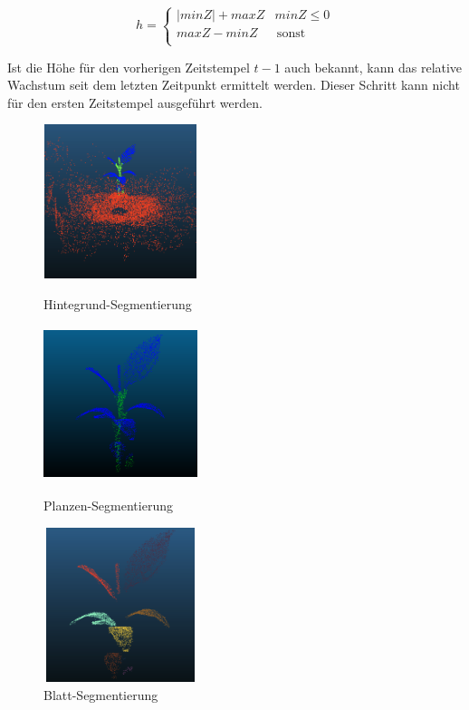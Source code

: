 \documentclass[12pt,titlepage, twoside]{article}
\begin{document}
\begin{equation}
    \label{eq:height}
    h = \left\{
    \begin{array}{ll}
    |minZ| + maxZ & minZ \leq 0 \\
    maxZ - minZ & \, \textrm{sonst} \\
    \end{array}
    \right. 
\end{equation}

Ist die Höhe für den vorherigen Zeitstempel $t-1$ auch bekannt, kann das relative Wachstum seit dem letzten Zeitpunkt ermittelt werden. Dieser Schritt kann nicht für den ersten Zeitstempel ausgeführt werden.

\begin{figure}
    \centering
    \begin{minipage}{0.3\textwidth}
        \centering
        \includegraphics[height=4.5cm,width=4.5cm]{./Images/PipelineBackgroundSegmentationStriped.png}
        \caption{Hintegrund-Segmentierung}
        \label{fig:PiplineBackgroundSegmentation}
    \end{minipage}\hfill
    \begin{minipage}{0.3\textwidth}
        \centering
        \includegraphics[height=4.5cm,width=4.5cm]{./Images/PipelinePlantSegmentation.png}
        \caption{Planzen-Segmentierung}
        \label{fig:PipelinePlantSegmentation}
    \end{minipage}\hfill
    \begin{minipage}{0.3\textwidth}
        \centering
        \includegraphics[height=4.5cm,width=4.5cm]{./Images/PipelineLeaveSegmentationStriped.png}
        \caption{Blatt-Segmentierung}
        \label{fig:PipelineLeaveSegmentation}
    \end{minipage}
\end{figure}
\end{document}

